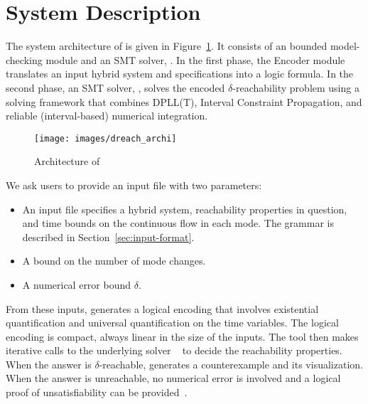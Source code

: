 \section{System Description}\label{sec:system}
The system architecture of \dReach{} is given in
Figure~\ref{sec:system}. It consists of an bounded model-checking
module and an SMT solver, \dReal{}. In the first phase, the Encoder
module translates an input hybrid system and specifications into a
logic formula. In the second phase, an SMT solver, \dReal{}, solves
the encoded $\delta$-reachability problem using a solving framework
that combines DPLL(T), Interval Constraint Propagation, and reliable
(interval-based) numerical integration.

\begin{figure}[h]
  \centering
  \texttt{[image: images/dreach\_archi]}
  \caption{Architecture of \dReach{}}\label{fig:system-description}
\end{figure}

We ask users to provide an input file with two parameters:
\begin{itemize}
\item An input file specifies a hybrid system, reachability properties
  in question, and time bounds on the continuous flow in each mode.
  The grammar is described in Section~\ref{sec:input-format}.
\item A bound on the number of mode changes.
\item A numerical error bound $\delta$.%
\end{itemize}

From these inputs, \dReach{} generates a logical encoding that
involves existential quantification and universal quantification on
the time variables. The logical encoding is compact, always linear in
the size of the inputs. The tool then makes iterative calls to the
underlying solver \dReal{}~\cite{DBLP:conf/cade/GaoKC13} to decide the
reachability properties. When the answer is {\sf $\delta$-reachable},
\dReach{} generates a counterexample and its visualization. When the
answer is {\sf unreachable}, no numerical error is involved and a
logical proof of unsatisfiability can be provided~\cite{SYNASC14}.

